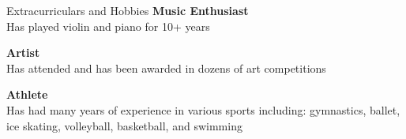 \documentclass{resume}
\begin{document}
\begin{rSection}{Extracurriculars and Hobbies}
{\bf Music Enthusiast}
\\Has played violin and piano for 10+ years

{\bf Artist}
\\Has attended and has been awarded in dozens of art competitions

{\bf Athlete}
\\Has had many years of experience in various sports including: gymnastics, ballet, ice skating, volleyball, basketball, and swimming

\end{rSection}
\end{document}
